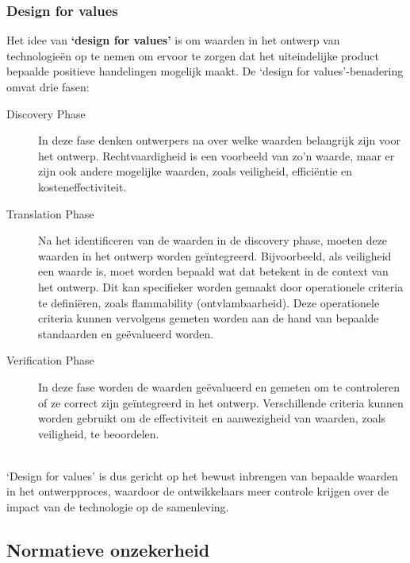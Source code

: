 \documentclass[../summary.tex]{subfiles}
\begin{document}
	\subsubsection{Design for values}
	
	Het idee van \textbf{`design for values'} is om waarden in het ontwerp van technologieën op te nemen om ervoor te zorgen dat het uiteindelijke product bepaalde positieve handelingen mogelijk maakt. De `design for values'-benadering omvat drie fasen:
	
	\begin{description}
		\item[Discovery Phase] In deze fase denken ontwerpers na over welke waarden belangrijk zijn voor het ontwerp. Rechtvaardigheid is een voorbeeld van zo'n waarde, maar er zijn ook andere mogelijke waarden, zoals veiligheid, efficiëntie en kosteneffectiviteit.
		
		\item[Translation Phase] Na het identificeren van de waarden in de discovery phase, moeten deze waarden in het ontwerp worden geïntegreerd. Bijvoorbeeld, als veiligheid een waarde is, moet worden bepaald wat dat betekent in de context van het ontwerp. Dit kan specifieker worden gemaakt door operationele criteria te definiëren, zoals flammability (ontvlambaarheid). Deze operationele criteria kunnen vervolgens gemeten worden aan de hand van bepaalde standaarden en geëvalueerd worden.
		
		\item[Verification Phase] In deze fase worden de waarden geëvalueerd en gemeten om te controleren of ze correct zijn geïntegreerd in het ontwerp. Verschillende criteria kunnen worden gebruikt om de effectiviteit en aanwezigheid van waarden, zoals veiligheid, te beoordelen.
	\end{description}
	\ \\
	`Design for values' is dus gericht op het bewust inbrengen van bepaalde waarden in het ontwerpproces, waardoor de ontwikkelaars meer controle krijgen over de impact van de technologie op de samenleving.
	
	\subsection{Normatieve onzekerheid}
	
\end{document}
